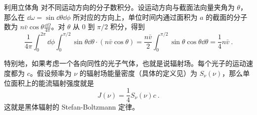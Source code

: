 利用立体角 对不同运动方向的分子数积分。设运动方向与截面法向量夹角为 $\theta$，那么在 $\dd\omega=\sin\dd\theta\dd\phi$ 所对应的方向上，单位时间内通过面积为 $a$ 的截面的分子数为 $n\bar v\cos\theta \frac{\dd\Omega}{4\pi}$。对 $\theta$ 从 $0$ 到 $\pi/2$ 积分，得到
\begin{equation}
\frac{1}{4\pi}\int_0^{2\pi}\dd\phi\int_0^{\pi/2}\sin\theta\dd\theta \cdot (n \bar v\cos\theta)=\frac{n\bar v}{2} \int_0^{\pi/2}\sin\theta\cos\theta \dd\theta = \frac{1}{4} n\bar v ~.
\end{equation}

特别地，如果考虑一个各向同性的光子气体，也就是说辐射场。每个光子的运动速度都为 $c$。假设频率为 $\nu$ 的辐射场能量密度（具体的定义见）为 $S_\nu(\nu)$，那么单位面积上的能流辐射强度就是
\begin{equation}
J(\nu)=\frac{1}{4} S_\nu(\nu) c ~.
\end{equation}
这就是黑体辐射的 Stefan-Boltzmann 定律。

